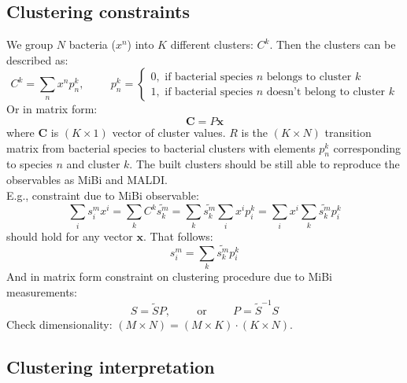 \documentclass[10pt,A4paper]{article}
\begin{document}
\subsection{Clustering constraints}
We group $N$ bacteria ($x^n$) into $K$ different clusters: $C^k$.
Then the clusters can be described as:
\begin{equation}
    C^k = \sum_n x^n p_n^k, \hspace{1cm} p_n^k = \begin{cases}
        0, \text{ if bacterial species $n$ belongs to cluster } k \\
        1, \text{ if bacterial species $n$ doesn't belong to cluster } k
    \end{cases}
\end{equation}
Or in matrix form: 
\begin{equation}
    \mathbf{C} = P \mathbf{x}
\end{equation}
where $\mathbf{C}$ is $(K \times 1)$ vector of cluster values.
$R$ is the $(K \times N)$ transition matrix from bacterial species to bacterial clusters with elements $p_n^k$ corresponding to species $n$ and cluster $k$.
The built clusters should be still able to reproduce the observables as MiBi and MALDI.\\
E.g., constraint due to MiBi observable:
\begin{equation}
    \sum_i s_i^m x^i = \sum_k C^k \tilde{s^m_k} = \sum_k  \tilde{s^m_k} \sum_i x^i p_i^k = \sum_i x^i \sum_k \tilde{s^m_k} p_i^k
\end{equation}
should hold for any vector $\mathbf{x}$.
That follows:
\begin{equation}
    \boxed{s_i^m = \sum_k \tilde{s^m_k} p_i^k}
\end{equation}
And in matrix form constraint on clustering procedure due to MiBi measurements:
\begin{equation}
    \boxed{S = \tilde{S} P}, \hspace{1cm} \text{or} \hspace{1cm}  \boxed{P = \tilde{S}^{-1} S}
\end{equation}
Check dimensionality: $(M \times N) = (M \times K) \cdot (K \times N)$.

\subsection{Clustering interpretation}

\end{document}
